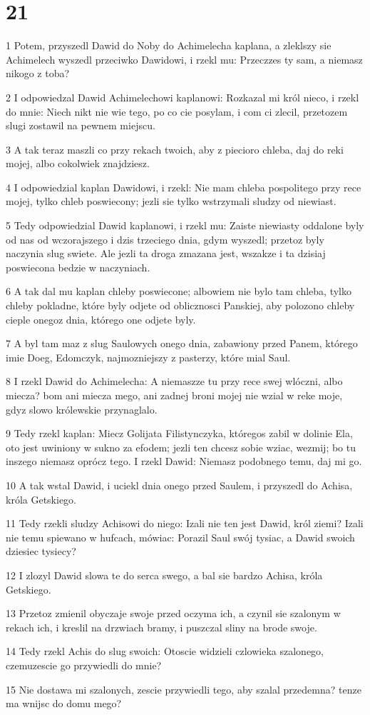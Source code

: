 \chapter{21}

\par 1 Potem, przyszedl Dawid do Noby do Achimelecha kaplana, a zleklszy sie Achimelech wyszedl przeciwko Dawidowi, i rzekl mu: Przeczzes ty sam, a niemasz nikogo z toba?
\par 2 I odpowiedzal Dawid Achimelechowi kaplanowi: Rozkazal mi król nieco, i rzekl do mnie: Niech nikt nie wie tego, po co cie posylam, i com ci zlecil, przetozem slugi zostawil na pewnem miejscu.
\par 3 A tak teraz maszli co przy rekach twoich, aby z piecioro chleba, daj do reki mojej, albo cokolwiek znajdziesz.
\par 4 I odpowiedzial kaplan Dawidowi, i rzekl: Nie mam chleba pospolitego przy rece mojej, tylko chleb poswiecony; jezli sie tylko wstrzymali sludzy od niewiast.
\par 5 Tedy odpowiedzial Dawid kaplanowi, i rzekl mu: Zaiste niewiasty oddalone byly od nas od wczorajszego i dzis trzeciego dnia, gdym wyszedl; przetoz byly naczynia slug swiete. Ale jezli ta droga zmazana jest, wszakze i ta dzisiaj poswiecona bedzie w naczyniach.
\par 6 A tak dal mu kaplan chleby poswiecone; albowiem nie bylo tam chleba, tylko chleby pokladne, które byly odjete od oblicznosci Panskiej, aby polozono chleby cieple onegoz dnia, którego one odjete byly.
\par 7 A byl tam maz z slug Saulowych onego dnia, zabawiony przed Panem, którego imie Doeg, Edomczyk, najmozniejszy z pasterzy, które mial Saul.
\par 8 I rzekl Dawid do Achimelecha: A niemaszze tu przy rece swej wlóczni, albo miecza? bom ani miecza mego, ani zadnej broni mojej nie wzial w reke moje, gdyz slowo królewskie przynaglalo.
\par 9 Tedy rzekl kaplan: Miecz Golijata Filistynczyka, któregos zabil w dolinie Ela, oto jest uwiniony w sukno za efodem; jezli ten chcesz sobie wziac, wezmij; bo tu inszego niemasz oprócz tego. I rzekl Dawid: Niemasz podobnego temu, daj mi go.
\par 10 A tak wstal Dawid, i uciekl dnia onego przed Saulem, i przyszedl do Achisa, króla Getskiego.
\par 11 Tedy rzekli sludzy Achisowi do niego: Izali nie ten jest Dawid, król ziemi? Izali nie temu spiewano w hufcach, mówiac: Porazil Saul swój tysiac, a Dawid swoich dziesiec tysiecy?
\par 12 I zlozyl Dawid slowa te do serca swego, a bal sie bardzo Achisa, króla Getskiego.
\par 13 Przetoz zmienil obyczaje swoje przed oczyma ich, a czynil sie szalonym w rekach ich, i kreslil na drzwiach bramy, i puszczal sliny na brode swoje.
\par 14 Tedy rzekl Achis do slug swoich: Otoscie widzieli czlowieka szalonego, czemuzescie go przywiedli do mnie?
\par 15 Nie dostawa mi szalonych, zescie przywiedli tego, aby szalal przedemna? tenze ma wnijsc do domu mego?

